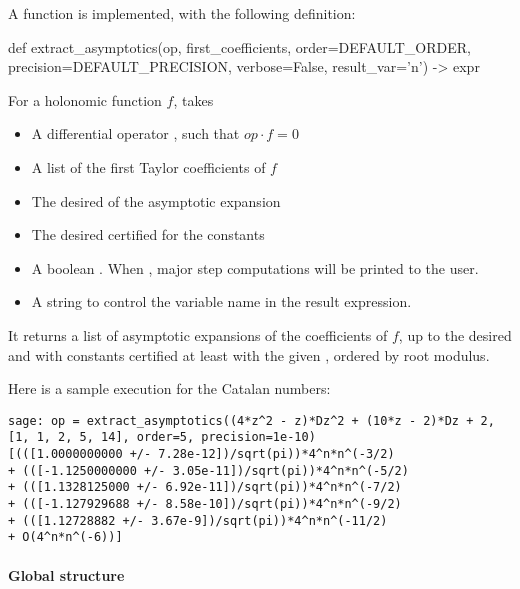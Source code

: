 \documentclass[../main.tex]{subfiles}
\begin{document}
A function  is implemented, with the following definition:

\begin{pyblock}
def extract_asymptotics(op,
						first_coefficients,
						order=DEFAULT_ORDER,
						precision=DEFAULT_PRECISION,
						verbose=False,
						result_var='n') -> expr
\end{pyblock}

For a holonomic function $f$,  takes

\begin{itemize}
	\item A differential operator , such that $op \cdot f = 0$
	
	\item A list  of the first Taylor coefficients of $f$
	
	\item The desired  of the asymptotic expansion
	
	\item The desired certified  for the constants
	
	\item A boolean . When , major step computations will be printed to the user.
	
	\item A string  to control the variable name in the result expression.
\end{itemize}

It returns a list of asymptotic expansions of the coefficients of $f$, up to the desired  and with constants certified at least with the given , ordered by root modulus.

Here is a sample execution for the Catalan numbers:

\begin{verbatim}
sage: op = extract_asymptotics((4*z^2 - z)*Dz^2 + (10*z - 2)*Dz + 2, [1, 1, 2, 5, 14], order=5, precision=1e-10)
[(([1.0000000000 +/- 7.28e-12])/sqrt(pi))*4^n*n^(-3/2)
+ (([-1.1250000000 +/- 3.05e-11])/sqrt(pi))*4^n*n^(-5/2)
+ (([1.1328125000 +/- 6.92e-11])/sqrt(pi))*4^n*n^(-7/2)
+ (([-1.127929688 +/- 8.58e-10])/sqrt(pi))*4^n*n^(-9/2)
+ (([1.12728882 +/- 3.67e-9])/sqrt(pi))*4^n*n^(-11/2)
+ O(4^n*n^(-6))]
\end{verbatim}

\paragraph{Global structure}
\end{document}
